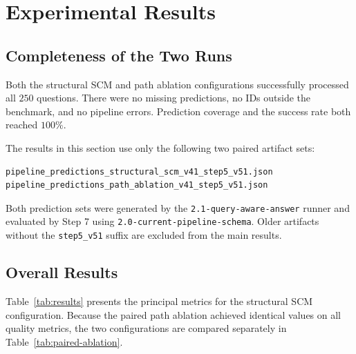 \section{Experimental Results}
\label{sec:results}

\subsection{Completeness of the Two Runs}

Both the structural SCM and path ablation configurations successfully
processed all \(250\) questions. There were no missing predictions, no IDs
outside the benchmark, and no pipeline errors. Prediction coverage and the
success rate both reached \(100\%\).

The results in this section use only the following two paired artifact sets:

\begin{verbatim}
pipeline_predictions_structural_scm_v41_step5_v51.json
pipeline_predictions_path_ablation_v41_step5_v51.json
\end{verbatim}

Both prediction sets were generated by the
\texttt{2.1-query-aware-answer} runner and evaluated by Step 7 using
\texttt{2.0-current-pipeline-schema}. Older artifacts without the
\texttt{step5\_v51} suffix are excluded from the main results.

\subsection{Overall Results}

Table~\ref{tab:results} presents the principal metrics for the structural
SCM configuration. Because the paired path ablation achieved identical
values on all quality metrics, the two configurations are compared
separately in Table~\ref{tab:paired-ablation}.

